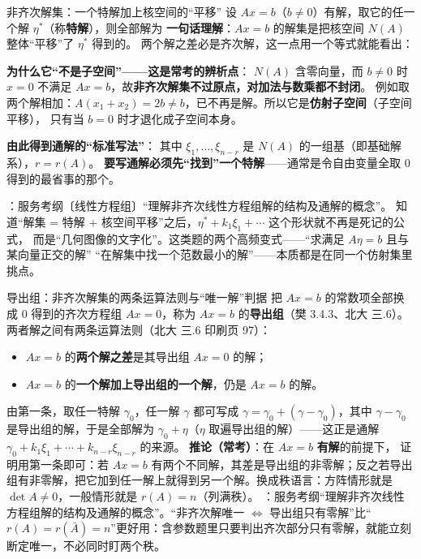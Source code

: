 
\begin{fdeep}{非齐次解集：一个特解加上核空间的“平移”}
设 $Ax=b$（$b\ne0$）有解，取它的任一个解 $\eta^{*}$（称\textbf{特解}），则全部解为
\textbf{一句话理解}：$Ax=b$ 的解集是把核空间 $N(A)$ 整体“平移”了 $\eta^{*}$ 得到的。
两个解之差必是齐次解，这一点用一个等式就能看出：

\textbf{为什么它“不是子空间”——这是常考的辨析点}：
$N(A)$ 含零向量，而 $b\ne0$ 时 $x=0$ 不满足 $Ax=b$，故\textbf{非齐次解集不过原点，对加法与数乘都不封闭}。
例如取两个解相加：$A(x_1+x_2)=2b\ne b$，已不再是解。所以它是\textbf{仿射子空间}（子空间平移），
只有当 $b=0$ 时才退化成子空间本身。

\medskip
\textbf{由此得到通解的“标准写法”}：
其中 $\xi_1,\dots,\xi_{n-r}$ 是 $N(A)$ 的一组基（即基础解系），$r=r(A)$。
\textbf{要写通解必须先“找到”一个特解}——通常是令自由变量全取 $0$ 得到的最省事的那个。

\fbref{}：服务考纲〔线性方程组〕“理解非齐次线性方程组解的结构及通解的概念”。
知道“解集 = 特解 + 核空间平移”之后，$\eta^{*}+k_1\xi_1+\cdots$ 这个形状就不再是死记的公式，
而是“几何图像的文字化”。这类题的两个高频变式——“求满足 $A\eta=b$ 且与某向量正交的解”
“在解集中找一个范数最小的解”——本质都是在同一个仿射集里挑点。
\end{fdeep}

\begin{fdeep}{导出组：非齐次解集的两条运算法则与“唯一解”判据}
把 $Ax=b$ 的常数项全部换成 $0$ 得到的齐次方程组 $Ax=0$，称为 $Ax=b$ 的\textbf{导出组}（樊 3.4.3、北大 三.6）。两者解之间有两条运算法则（北大 三.6 印刷页 97）：
\begin{itemize}[leftmargin=2.2em,itemsep=0.25em]
\item $Ax=b$ 的\textbf{两个解之差}是其导出组 $Ax=0$ 的解；
\item $Ax=b$ 的\textbf{一个解加上导出组的一个解}，仍是 $Ax=b$ 的解。
\end{itemize}
由第一条，取任一特解 $\gamma_0$，任一解 $\gamma$ 都可写成 $\gamma=\gamma_0+(\gamma-\gamma_0)$，其中 $\gamma-\gamma_0$ 是导出组的解，于是全部解为 $\gamma_0+\eta$（$\eta$ 取遍导出组的解）——这正是通解 $\gamma_0+k_1\xi_1+\cdots+k_{n-r}\xi_{n-r}$ 的来源。
\textbf{推论（常考）}：在 $Ax=b$ \textbf{有解}的前提下，
证明用第一条即可：若 $Ax=b$ 有两个不同解，其差是导出组的非零解；反之若导出组有非零解，把它加到任一解上就得到另一个解。换成秩语言：方阵情形就是 $\det A\ne0$，一般情形就是 $r(A)=n$（列满秩）。
\fbref{}：服务考纲“理解非齐次线性方程组解的结构及通解的概念”。“非齐次解唯一 $\iff$ 导出组只有零解”比“$r(A)=r(\bar A)=n$”更好用：含参数题里只要判出齐次部分只有零解，就能立刻断定唯一，不必同时盯两个秩。
\end{fdeep}

